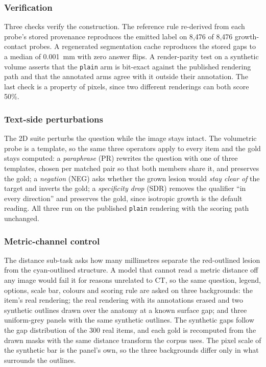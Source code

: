\subsubsection{Verification} Three checks verify the construction. The
reference rule re-derived from each probe's stored provenance reproduces the
emitted label on 8{,}476 of 8{,}476 growth-contact probes. A regenerated
segmentation cache reproduces the stored gaps to a median of 0.001~mm with
zero answer flips. A render-parity test on a synthetic volume asserts that
the \texttt{plain} arm is bit-exact against the published rendering path
and that the annotated arms agree with it outside their annotation. The last
check is a property of pixels, since two different renderings can both score
50\%.

\subsubsection{Text-side perturbations} The 2D suite perturbs the question
while the image stays intact. The volumetric probe is a template, so the same
three operators apply to every item and the gold stays computed: a
\emph{paraphrase} (PR) rewrites the question with one of three templates,
chosen per matched pair so that both members share it, and preserves the
gold; a \emph{negation} (NEG) asks whether the grown lesion would \emph{stay
clear of} the target and inverts the gold; a \emph{specificity drop} (SDR)
removes the qualifier ``in every direction'' and preserves the gold, since
isotropic growth is the default reading. All three run on the published
\texttt{plain} rendering with the scoring path unchanged.

\subsubsection{Metric-channel control} The distance sub-task asks how many
millimetres separate the red-outlined lesion from the cyan-outlined structure.
A model that cannot read a metric distance off any image would fail it for
reasons unrelated to CT, so the same question, legend, options, scale bar,
colours and scoring rule are asked on three backgrounds: the item's real
rendering; the real rendering with its annotations erased and two synthetic
outlines drawn over the anatomy at a known surface gap; and three
uniform-grey panels with the same synthetic outlines. The synthetic gaps
follow the gap distribution of the 300 real items, and each gold is
recomputed from the drawn masks with the same distance transform the corpus
uses. The pixel scale of the synthetic bar is the panel's own, so the three
backgrounds differ only in what surrounds the outlines.

